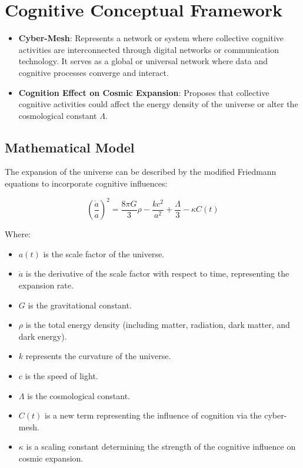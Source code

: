 \documentclass{article}
\begin{document}
\section{Cognitive Conceptual Framework}
\begin{itemize}
    \item \textbf{Cyber-Mesh}: Represents a network or system where collective cognitive activities are interconnected through digital networks or communication technology. It serves as a global or universal network where data and cognitive processes converge and interact.
    \item \textbf{Cognition Effect on Cosmic Expansion}: Proposes that collective cognitive activities could affect the energy density of the universe or alter the cosmological constant $\Lambda$.
\end{itemize}

\subsection{Mathematical Model}
The expansion of the universe can be described by the modified Friedmann equations to incorporate cognitive influences:

\begin{equation}
\left(\frac{\dot{a}}{a}\right)^2 = \frac{8\pi G}{3}\rho - \frac{kc^2}{a^2} + \frac{\Lambda}{3} - \kappa C(t)
\end{equation}

Where:
\begin{itemize}
    \item $a(t)$ is the scale factor of the universe.
    \item $\dot{a}$ is the derivative of the scale factor with respect to time, representing the expansion rate.
    \item $G$ is the gravitational constant.
    \item $\rho$ is the total energy density (including matter, radiation, dark matter, and dark energy).
    \item $k$ represents the curvature of the universe.
    \item $c$ is the speed of light.
    \item $\Lambda$ is the cosmological constant.
    \item $C(t)$ is a new term representing the influence of cognition via the cyber-mesh.
    \item $\kappa$ is a scaling constant determining the strength of the cognitive influence on cosmic expansion.
\end{itemize}
\end{document}
